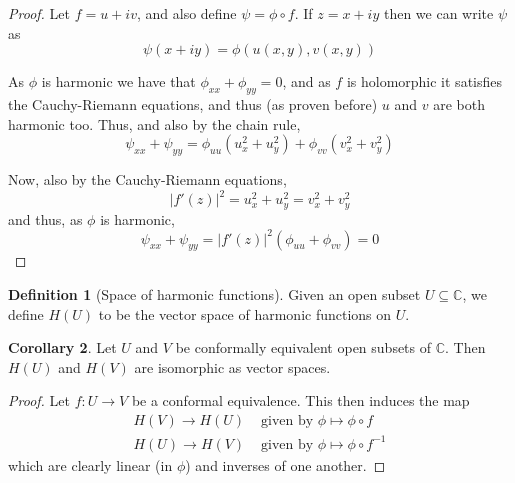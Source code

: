 \documentclass[10pt,fleqn]{article}
\newcommand{\comps}{\mathbb{C}}
\theoremstyle{definition} \newtheorem{defn}{Definition}[section]
\theoremstyle{plain}      \newtheorem{thm}[defn]{Theorem}
\theoremstyle{definition} \newtheorem{prop}[defn]{Proposition}
\theoremstyle{plain}      \newtheorem{lem}[defn]{Lemma}
\theoremstyle{definition} \newtheorem{cor}[defn]{Corollary}
\theoremstyle{definition} \newtheorem{ex}[defn]{Example}
\theoremstyle{definition} \newtheorem{rem}[defn]{Remark}
\begin{document}
\begin{proof}
    Let $f=u+iv$, and also define $\psi=\phi\circ f$.
    If $z=x+iy$ then we can write $\psi$ as
    \[
        \psi(x+iy)=
        \phi(u(x,y),v(x,y))
    \]

    As $\phi$ is harmonic we have that $\phi_{xx}+\phi_{yy}=0$, and as $f$ is holomorphic it satisfies the Cauchy-Riemann equations, and thus (as proven before) $u$ and $v$ are both harmonic too.
    Thus, and also by the chain rule,
    \[
        \psi_{xx}+\psi_{yy}=
        \phi_{uu}(u_x^2+u_y^2)+\phi_{vv}(v_x^2+v_y^2)
    \]

    Now, also by the Cauchy-Riemann equations,
    \[
        |f'(z)|^2=
        u_x^2+u_y^2=
        v_x^2+v_y^2
    \]
    and thus, as $\phi$ is harmonic,
    \[
        \psi_{xx}+\psi_{yy}=
        |f'(z)|^2(\phi_{uu}+\phi_{vv})=
        0
    \]
\end{proof}

\begin{defn}[Space of harmonic functions]
    Given an open subset $U\subseteq\comps$, we define $H(U)$ to be the vector space of harmonic functions on $U$.
\end{defn}

\begin{cor}
    Let $U$ and $V$ be conformally equivalent open subsets of $\comps$.
    Then $H(U)$ and $H(V)$ are isomorphic as vector spaces.
\end{cor}

\begin{proof}
    Let $f:U\to V$ be a conformal equivalence.
    This then induces the map
    \begin{align*}
        H(V)\to H(U)&\text{ given by }\phi\mapsto\phi\circ f\\
        H(U)\to H(V)&\text{ given by }\phi\mapsto\phi\circ f^{-1}
    \end{align*}
    which are clearly linear (in $\phi$) and inverses of one another.
\end{proof}
\end{document}
